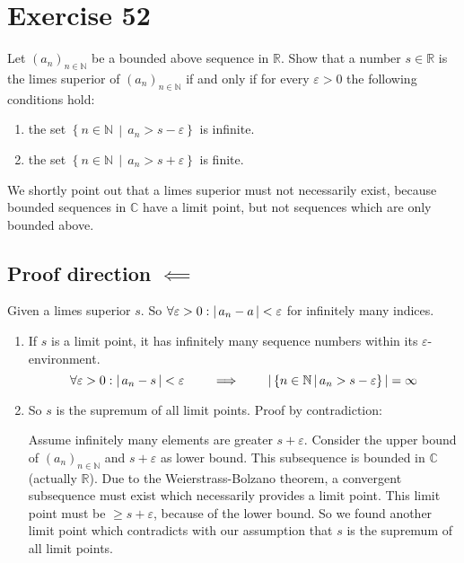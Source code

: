 \documentclass[a4paper]{article}
\theoremstyle{definition}
\newcommand\abs[1]{\left|\thinspace #1\thinspace\right|}
\newcommand\setdef[2]{\left\{#1\,\middle|\,#2\right\}}
\newcommand\card[1]{\left|\,#1\,\right|}
\newcommand\seq[1]{\left(#1\right)_{n\in\mathbb N}}
\begin{document}
\section{Exercise 52}
\begin{ex}
  Let $\seq{a_n}$ be a bounded above sequence in $\mathbb R$. Show that
  a number $s \in \mathbb R$ is the limes superior of $\seq{a_n}$ if and only if
  for every $\varepsilon > 0$ the following conditions hold:
  \begin{enumerate}
    \item the set $\setdef{n \in \mathbb N}{a_n > s - \varepsilon}$ is infinite.
    \item the set $\setdef{n \in \mathbb N}{a_n > s + \varepsilon}$ is finite.
  \end{enumerate}
\end{ex}

We shortly point out that a limes superior must not necessarily exist,
because bounded sequences in $\mathbb C$ have a limit point,
but not sequences which are only bounded above.

\subsection{Proof direction $\impliedby$}

Given a limes superior $s$. So $\forall \varepsilon > 0: \abs{a_n - a} < \varepsilon$
for infinitely many indices.

%
\begin{enumerate}
  \item If $s$ is a limit point, it has infinitely many sequence numbers within its $\varepsilon$-environment.
    \[
      \forall \varepsilon > 0: \abs{a_n - s} < \varepsilon
      \qquad\implies\qquad
      \card{\setdef{n \in \mathbb N}{a_n > s - \varepsilon}} = \infty
    \]
  \item
    So $s$ is the supremum of all limit points. Proof by contradiction:

    Assume infinitely many elements are greater $s + \varepsilon$.
    Consider the upper bound of $\seq{a_n}$ and $s+\varepsilon$ as lower bound.
    This subsequence is bounded in $\mathbb C$ (actually $\mathbb R$).
    Due to the Weierstrass-Bolzano theorem, a convergent subsequence must exist
    which necessarily provides a limit point. This limit point must be $\geq s + \varepsilon$,
    because of the lower bound. So we found another limit point which contradicts
    with our assumption that $s$ is the supremum of all limit points.
\end{enumerate}
\end{document}
